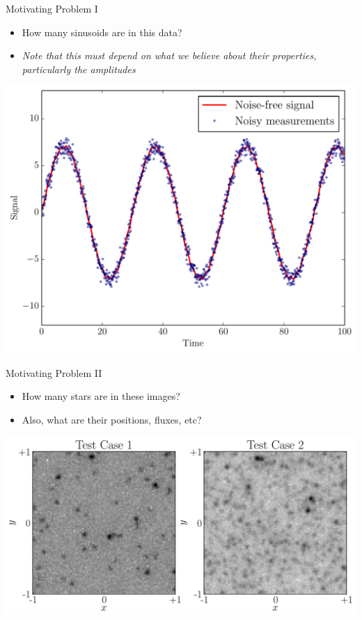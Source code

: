 \begin{frame}[t]{Motivating Problem I}
\begin{itemize}
\item How many sinusoids are in this data?
\item {\it Note that this must depend on what we believe about their properties,
particularly the amplitudes}
\end{itemize}
\begin{center}
\includegraphics[scale=0.35]{sinewave_data.pdf}
\end{center}
\end{frame}

\begin{frame}[t]{Motivating Problem II}
\begin{itemize}
\item How many stars are in these images?
\item Also, what are their positions, fluxes, etc?
\end{itemize}
\begin{center}
\includegraphics[scale=0.35]{test_cases.pdf}
\end{center}
\end{frame}

